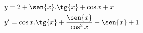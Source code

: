 \begin{ex}
\begin{align}
&y=2+\sen{x}.\tg{x}+\cos{x}+x\nonumber\\
&y'=\cos{x}.\tg{x}+\frac{\sen{x}}{\cos^2{x}}-\sen{x}+1\nonumber
\end{align}
\end{ex}
